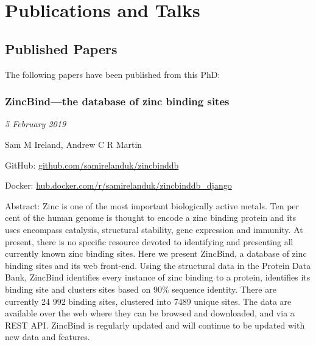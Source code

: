 



\chapter{Publications and Talks} %



\section{Published Papers}

The following papers have been published from this PhD:

\subsection{ZincBind—the database of zinc binding sites}

\emph{5 February 2019}

Sam M Ireland, Andrew C R Martin

GitHub: \url{github.com/samirelanduk/zincbinddb}

Docker: \url{hub.docker.com/r/samirelanduk/zincbinddb_django}

Abstract: Zinc is one of the most important biologically active metals. Ten per cent of the human genome is thought to encode a zinc binding protein and its uses encompass catalysis, structural stability, gene expression and immunity. At present, there is no specific resource devoted to identifying and presenting all currently known zinc binding sites. Here we present ZincBind, a database of zinc binding sites and its web front-end. Using the structural data in the Protein Data Bank, ZincBind identifies every instance of zinc binding to a protein, identifies its binding site and clusters sites based on 90\% sequence identity. There are currently 24 992 binding sites, clustered into 7489 unique sites. The data are available over the web where they can be browsed and downloaded, and via a REST API. ZincBind is regularly updated and will continue to be updated with new data and features.


